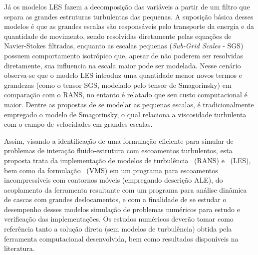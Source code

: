 Já os modelos LES fazem a decomposição das variáveis a partir de um filtro que separa as grandes estruturas turbulentas das pequenas. A suposição básica desses modelos é que as grandes escalas são responsáveis pelo transporte da energia e da quantidade de movimento, sendo resolvidas diretamente pelas equações de Navier-Stokes filtradas, enquanto as escalas pequenas (\textit{Sub-Grid Scales} - SGS) possuem comportamento isotrópico que, apesar de não poderem ser resolvidas diretamente, sua influencia na escala maior pode ser modelada. Nesse cenário observa-se que o modelo LES introduz uma quantidade menor novos termos e grandezas (como o tensor SGS, modelado pelo tensor de Smagorinsky) em comparação com o RANS, no entanto é relatado que seu custo computacional é maior. Dentre as propostas de se modelar as pequenas escalas, é tradicionalmente empregado o modelo de Smagorinsky, o qual relaciona a viscosidade turbulenta com o campo de velocidades em grandes escalas.




Assim, visando a identificação de uma formulação eficiente para simular de problemas de interação fluido-estrutura com escoamentos turbulentos, esta proposta trata da implementação de modelos de turbulência \RANS\ (RANS) e \LES\ (LES), bem como da formulação \VMS\ (VMS) em um programa para escoamentos incompressíveis com contornos móveis (empregando descrição ALE), do acoplamento da ferramenta resultante com um programa para análise dinâmica de cascas com grandes deslocamentos, e com a finalidade de se estudar o desempenho desses modelos simulação de problemas numéricos para estudo e verificação das implementações. Os estudos numéricos deverão tomar como referência tanto a solução direta (sem modelos de turbulência) obtida pela ferramenta computacional desenvolvida, bem como resultados disponíveis na literatura.

